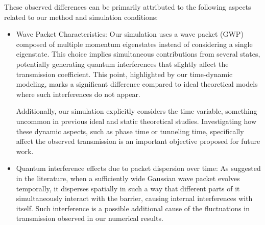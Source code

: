 These observed differences can be primarily attributed to the following aspects related to our method and simulation conditions:

\begin{itemize}
    \item Wave Packet Characteristics:
    Our simulation uses a wave packet (GWP) composed of multiple momentum eigenstates instead of considering a single eigenstate.
    This choice implies simultaneous contributions from several states, potentially generating quantum interferences that slightly affect the transmission coefficient\cite{Staelens2021}.
    This point, highlighted by our time-dynamic modeling, marks a significant difference compared to ideal theoretical models where such interferences do not appear.

    Additionally, our simulation explicitly considers the time variable, something uncommon in previous ideal and static theoretical studies.
    Investigating how these dynamic aspects, such as phase time or tunneling time, specifically affect the observed transmission is an important objective proposed for future work.

    \item Quantum interference effects due to packet dispersion over time:
    As suggested in the literature\cite{MolgadoMex2018}, when a sufficiently wide Gaussian wave packet evolves temporally, it disperses spatially in such a way that different parts of it simultaneously interact with the barrier, causing internal interferences with itself.
    Such interference is a possible additional cause of the fluctuations in transmission observed in our numerical results.
\end{itemize}
    
